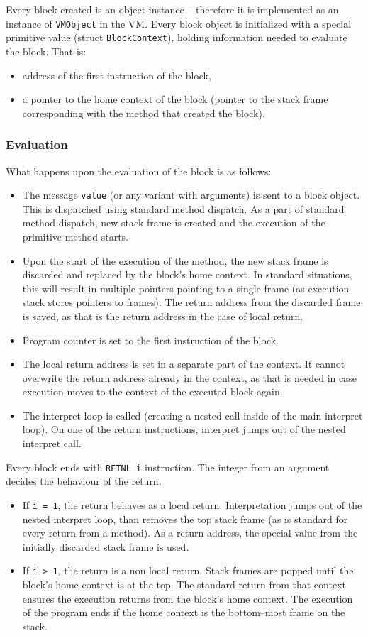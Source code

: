\documentclass[thesis=M,english]{FITthesis}[2019/12/23]
\begin{document}
Every block created is an object instance -- therefore it is implemented as an instance of \texttt{VMObject} in the VM. Every block object is
initialized with a special primitive value (struct \texttt{BlockContext}), holding information needed to evaluate the block. That is:
\begin{itemize}
	\item address of the first instruction of the block,
	\item a pointer to the home context of the block (pointer to the stack frame corresponding with the method that created the block).
\end{itemize}

\subsubsection{Evaluation}
What happens upon the evaluation of the block is as follows:
\begin{itemize}
	\item The message \texttt{value} (or any variant with arguments) is sent to a block object. This is dispatched using standard method
		dispatch. As a part of standard method dispatch, new stack frame is created and the execution of the primitive method starts.
	\item Upon the start of the execution of the method, the new stack frame is discarded and replaced by the block's home context. In
		standard situations, this will result in multiple pointers pointing to a single frame (as execution stack stores pointers to frames).
		The return address from the discarded frame is saved, as that is the return address in the case of local return.
	\item Program counter is set to the first instruction of the block.
	\item The local return address is set in a separate part of the context. It cannot overwrite the return address already in the context,
		as that is needed in case execution moves to the context of the executed block again.
	\item The interpret loop is called (creating a nested call inside of the main interpret loop). On one of the return instructions, 
		interpret jumps out of the nested interpret call. 
\end{itemize}

Every block ends with \texttt{RETNL i} instruction. The integer from an argument decides the behaviour of the return.
\begin{itemize}
	\item If \texttt{i = 1}, the return behaves as a local return. Interpretation jumps out of the nested interpret loop, than removes
		the top stack frame (as is standard for every return from a method). As a return address, the special value from the initially
		discarded stack frame is used.
	\item If \texttt{i > 1}, the return is a non local return. Stack frames are popped until the block's home context is at the top.
		The standard return from that context ensures the execution returns from the block's home context. The execution of the program
		ends if the home context is the bottom--most frame on the stack.
\end{itemize}
\end{document}
